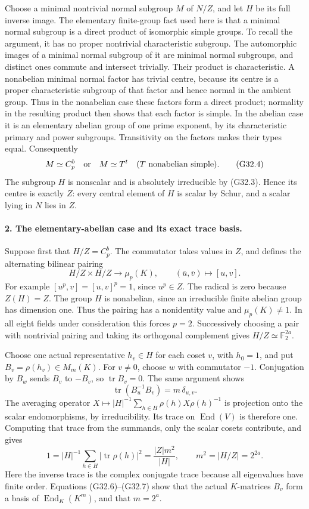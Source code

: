 Choose a minimal nontrivial normal subgroup \(M\) of \(N/Z\),
and let \(H\) be its full inverse image. The elementary finite-group
fact used here is that a minimal normal subgroup is a direct product
of isomorphic simple groups. To recall the argument, it has no
proper nontrivial characteristic subgroup. The automorphic images
of a minimal normal subgroup of it are minimal normal subgroups,
and distinct ones commute and intersect trivially. Their product
is characteristic. A nonabelian minimal normal factor has trivial
centre, because its centre is a proper characteristic subgroup of
that factor and hence normal in the ambient group. Thus in the
nonabelian case these factors form a direct product;
normality in the resulting product then shows that each factor is
simple. In the abelian case it is an elementary abelian group of
one prime exponent, by its characteristic primary and power
subgroups. Transitivity on the factors makes their types equal.
Consequently
\[
 M\simeq C_p^b\quad\hbox{or}\quad M\simeq T^t
       \quad(T\text{ nonabelian simple}).
 \tag{G32.4}
\]
The subgroup \(H\) is nonscalar and is absolutely irreducible by
(G32.3). Hence its centre is exactly \(Z\): every central element
of \(H\) is scalar by Schur, and a scalar lying in \(N\) lies in \(Z\).

\paragraph{2. The elementary-abelian case and its exact trace basis.}
Suppose first that \(H/Z=C_p^b\). The commutator takes values in
\(Z\), and defines the alternating bilinear pairing
\[
 H/Z\times H/Z\longrightarrow\mu_p(K),
                  \qquad (\bar u,\bar v)\longmapsto[u,v].
 \tag{G32.5}
\]
For example \([u^p,v]=[u,v]^p=1\), since \(u^p\in Z\).
The radical is zero because \(Z(H)=Z\). The group \(H\) is
nonabelian, since an irreducible finite abelian group has dimension
one. Thus the pairing has a nonidentity value and \(\mu_p(K)\ne1\).
In all eight fields under consideration this forces \(p=2\).
Successively choosing a pair with nontrivial pairing and taking its
orthogonal complement gives \(H/Z\simeq\mathbb F_2^{2a}\).

Choose one actual representative \(h_v\in H\) for each coset
\(v\), with \(h_0=1\), and put \(B_v=\rho(h_v)\in M_m(K)\).
For \(v\ne0\), choose \(w\) with commutator \(-1\). Conjugation
by \(B_w\) sends \(B_v\) to \(-B_v\), so \(\operatorname{tr}B_v=0\).
The same argument shows
\[
       \operatorname{tr}(B_u^{-1}B_v)=m\,\delta_{u,v}.
 \tag{G32.6}
\]
The averaging operator
\(X\mapsto |H|^{-1}\sum_{h\in H}\rho(h)X\rho(h)^{-1}\)
is projection onto the scalar endomorphisms, by irreducibility.
Its trace on \(\operatorname{End}(V)\) is therefore one. Computing
that trace from the summands, only the scalar cosets contribute,
and gives
\[
 1=|H|^{-1}\sum_{h\in H}|\operatorname{tr}\rho(h)|^2
      =\frac{|Z|m^2}{|H|},\qquad m^2=|H/Z|=2^{2a}.
 \tag{G32.7}
\]
Here the inverse trace is the complex conjugate trace because
all eigenvalues have finite order. Equations (G32.6)--(G32.7)
show that the actual \(K\)-matrices \(B_v\) form a basis of
\(\operatorname{End}_K(K^m)\), and that \(m=2^a\).

